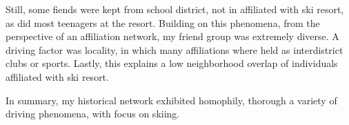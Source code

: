 \documentclass[12pt]{article}
\begin{document}
Still, some fiends were kept from school district, not in affiliated with ski resort, as did most teenagers at the resort. 
Building on this phenomena, from the perspective of an affiliation network, my friend group was extremely diverse. 
A driving factor was locality, in which many affiliations where held as interdistrict clubs or sports. 
Lastly, this explains a low neighborhood overlap of individuals affiliated with ski resort. 

In summary, my historical network exhibited homophily, thorough a variety of driving phenomena, with focus on skiing.
\end{document}
